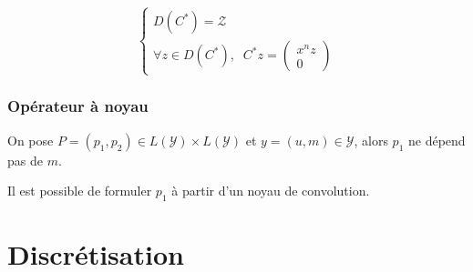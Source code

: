 \documentclass[a4paper]{article}
\begin{document}
\begin{equation}
	\begin{cases}
		D(C^*) = \mathscr{Z} \\
        \forall z \in D(C^*), \; \;
	C^* z
	= \left(\begin{array}{c}
		x^n z \\
		0
		\end{array}\right)
	\end{cases}
\end{equation}

\subsubsection{Opérateur à noyau}



\begin{lemme}
	On pose $P = (p_1,p_2) \in L(\mathscr{Y})\times L(\mathscr{Y})$
	et $y=(u,m) \in \mathscr{Y}$,
    alors $p_1$ ne dépend pas de $m$.
\end{lemme}

\begin{preuve}
	
\end{preuve}

Il est possible de formuler $p_1$ à partir d'un noyau de convolution.



\newpage
\section{Discrétisation}
\end{document}
